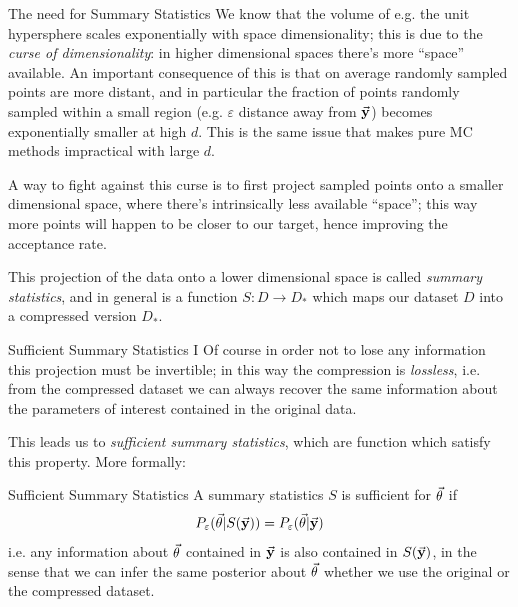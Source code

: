 \documentclass{beamer}
\theoremstyle{remark}
\begin{document}
\begin{frame}[allowframebreaks]{The need for Summary Statistics}
We know that the volume of e.g. the unit hypersphere scales exponentially with space dimensionality; this is due to the \emph{curse of dimensionality}: in higher dimensional spaces there's more ``space'' available. An important consequence of this is that on average randomly sampled points are more distant, and in particular the fraction of points randomly sampled within a small region (e.g. $\varepsilon$ distance away from $\va{y}$) becomes exponentially smaller at high $d$. This is the same issue that makes pure MC methods impractical with large $d$.


\framebreak
A way to fight against this curse is to first project sampled points onto a smaller dimensional space, where there's intrinsically less available ``space''; this way more points will happen to be closer to our target, hence improving the acceptance rate. 

This projection of the data onto a lower dimensional space is called \emph{summary statistics}, and in general is a function $S:D\to D_*$ which maps our dataset $D$ into a compressed version $D_*$.
\end{frame}

\begin{frame}{Sufficient Summary Statistics I}
Of course in order not to lose any information this projection must be invertible; in this way the compression is \emph{lossless}, i.e. from the compressed dataset we can always recover the same information about the parameters of interest contained in the original data. 

This leads us to \emph{sufficient summary statistics}, which are function which satisfy this property. More formally:
\pause
\begin{block}{Sufficient Summary Statistics}
A summary statistics $S$ is sufficient for $\va{\theta}$ if
\begin{equation*}
    P_\varepsilon(\va{\theta}|S(\va{y})) = P_\varepsilon(\va{\theta}|\va{y})
\end{equation*}
i.e. any information about $\va{\theta}$ contained in $\va{y}$ is also contained in $S(\va{y})$, in the sense that we can infer the same posterior about $\va{\theta}$ whether we use the original or the compressed dataset.
\end{block}
\end{frame}
\end{document}
